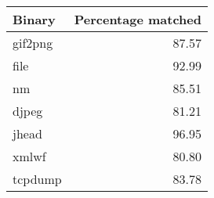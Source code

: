 \begin{tabular}{lr}
\toprule
  Binary & Percentage matched \\
\midrule
 gif2png &              87.57 \\
    file &              92.99 \\
      nm &              85.51 \\
   djpeg &              81.21 \\
   jhead &              96.95 \\
   xmlwf &              80.80 \\
 tcpdump &              83.78 \\
\bottomrule
\end{tabular}
